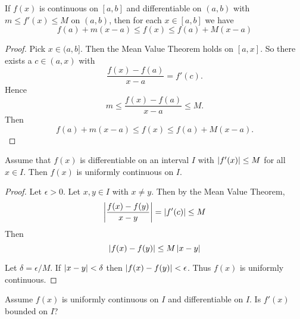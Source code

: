 
\begin{thm}
    If $f(x)$ is continuous on $[a,b]$ and differentiable on $(a,b)$ with $m\leq f'(x) \leq M$ on $(a,b)$, then for each $x\in [a,b]$ we have 
    \[f(a) + m(x-a) \leq f(x) \leq f(a) + M(x-a)\]
\end{thm}

\begin{proof}
    Pick $x \in (a,b]$. Then the Mean Value Theorem holds on $[a,x]$. So there exists a $c \in (a,x)$ with \[\frac{f(x) - f(a)}{x-a} = f'(c).\] Hence 
    \[m\leq \frac{f(x) - f(a)}{x-a} \leq M.\] Then \[f(a) + m(x-a) \leq f(x) \leq f(a) + M(x-a).\]
\end{proof}

\begin{thm}
    Assume that $f(x)$ is differentiable on an interval $I$ with $\left| f'(x) \right| \leq M$ for all $x\in I$. Then $f(x)$ is uniformly continuous on $I$.
\end{thm}

\begin{proof}
    Let $\epsilon > 0$. Let $x, y \in I$ with $x\neq y$. Then by the Mean Value Theorem, \[\left| \frac{f(x) - f(y)}{x-y} \right| = \left| f'(c) \right| \leq M\] Then \[\left| f(x)-f(y) \right| \leq M\left| x-y \right|\]
  
    Let $\delta = \epsilon / M$. If $\left| x-y \right| < \delta$ then $\left| f(x) - f(y) \right| < \epsilon$. Thus $f(x)$ is uniformly continuous.
\end{proof}

\begin{ques}
Assume $f(x)$ is uniformly continuous on $I$ and differentiable on $I$. Is $f'(x)$ bounded on $I$?
\end{ques}